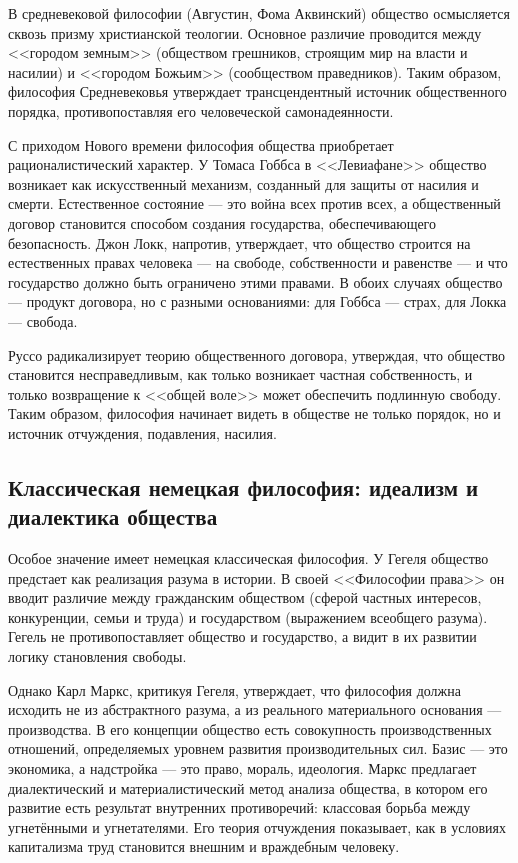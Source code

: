 \documentclass[12pt,a4paper]{article}
\begin{document}
	В средневековой философии (Августин, Фома Аквинский) общество осмысляется сквозь призму христианской теологии. Основное различие проводится между <<городом земным>> (обществом грешников, строящим мир на власти и насилии) и <<городом Божьим>> (сообществом праведников). Таким образом, философия Средневековья утверждает трансцендентный источник общественного порядка, противопоставляя его человеческой самонадеянности.
	
	С приходом Нового времени философия общества приобретает рационалистический характер. У Томаса Гоббса в <<Левиафане>> общество возникает как искусственный механизм, созданный для защиты от насилия и смерти. Естественное состояние — это война всех против всех, а общественный договор становится способом создания государства, обеспечивающего безопасность. Джон Локк, напротив, утверждает, что общество строится на естественных правах человека — на свободе, собственности и равенстве — и что государство должно быть ограничено этими правами. В обоих случаях общество — продукт договора, но с разными основаниями: для Гоббса — страх, для Локка — свобода.
	
	Руссо радикализирует теорию общественного договора, утверждая, что общество становится несправедливым, как только возникает частная собственность, и только возвращение к <<общей воле>> может обеспечить подлинную свободу. Таким образом, философия начинает видеть в обществе не только порядок, но и источник отчуждения, подавления, насилия.
	
	\subsection{Классическая немецкая философия: идеализм и диалектика общества}
	Особое значение имеет немецкая классическая философия. У Гегеля общество предстает как реализация разума в истории. В своей <<Философии права>> он вводит различие между гражданским обществом (сферой частных интересов, конкуренции, семьи и труда) и государством (выражением всеобщего разума). Гегель не противопоставляет общество и государство, а видит в их развитии логику становления свободы.
	
	Однако Карл Маркс, критикуя Гегеля, утверждает, что философия должна исходить не из абстрактного разума, а из реального материального основания — производства. В его концепции общество есть совокупность производственных отношений, определяемых уровнем развития производительных сил. Базис — это экономика, а надстройка — это право, мораль, идеология. Маркс предлагает диалектический и материалистический метод анализа общества, в котором его развитие есть результат внутренних противоречий: классовая борьба между угнетёнными и угнетателями. Его теория отчуждения показывает, как в условиях капитализма труд становится внешним и враждебным человеку.
	
\end{document}
